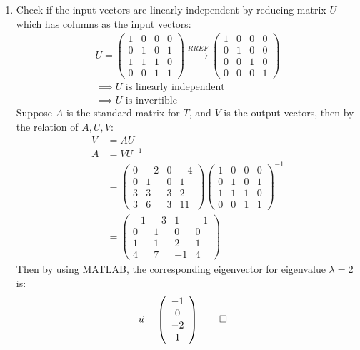 \documentclass[12pt, a4paper]{article}
\begin{document}
\begin{enumerate}[Q\arabic*.]
\item Check if the input vectors are linearly independent by reducing matrix $U$ which has columns as the input vectors:
  \begin{gather*}
    U = \left(\begin{array}{cccc} 1 & 0 & 0 & 0\\ 0 & 1 & 0 & 1\\ 1 & 1 & 1 & 0\\ 0 & 0 & 1 & 1 \end{array}\right)\xrightarrow{RREF} \left(\begin{array}{cccc} 1 & 0 & 0 & 0\\ 0 & 1 & 0 & 0\\ 0 & 0 & 1 & 0\\ 0 & 0 & 0 & 1 \end{array}\right)\\
    \implies U \text{ is linearly independent}\\
    \implies U \text{ is invertible}
  \end{gather*}
  Suppose $A$ is the standard matrix for $T$, and $V$ is the output vectors, then by the relation of $A, U, V$:
  \begin{align*}
    V &= AU\\
    A &= VU^{-1}\\
      &= \left(\begin{array}{cccc} 0 & -2 & 0 & -4\\ 0 & 1 & 0 & 1\\ 3 & 3 & 3 & 2\\ 3 & 6 & 3 & 11 \end{array}\right)\left(\begin{array}{cccc} 1 & 0 & 0 & 0\\ 0 & 1 & 0 & 1\\ 1 & 1 & 1 & 0\\ 0 & 0 & 1 & 1 \end{array}\right)^{-1}\\
      &= \left(\begin{array}{cccc} -1 & -3 & 1 & -1\\ 0 & 1 & 0 & 0\\ 1 & 1 & 2 & 1\\ 4 & 7 & -1 & 4 \end{array}\right)
  \end{align*}
  Then by using MATLAB, the corresponding eigenvector for eigenvalue $\lambda = 2$ is:
  \begin{align*}
    \vec{u} &= \left(\begin{array}{c} -1\\ 0\\ -2\\ 1 \end{array}\right) \qed
  \end{align*}
\end{enumerate}
\end{document}
